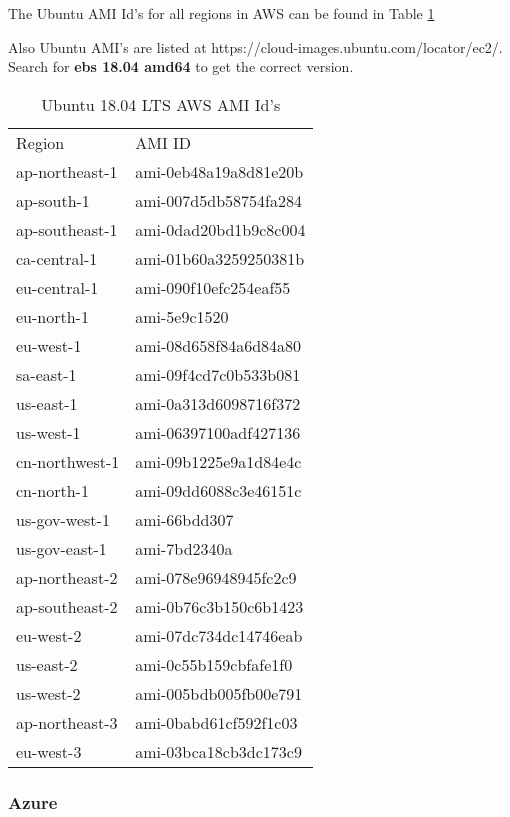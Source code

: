 The Ubuntu AMI Id's for all regions in AWS can be found in Table \ref{ubuntuami}

Also Ubuntu AMI's are listed at https://cloud-images.ubuntu.com/locator/ec2/. Search for \textbf{ebs 18.04 amd64} to get the correct version.

\begin{table}[]
\centering
\begin{tabular}{ll}
Region         & AMI ID                \\
ap-northeast-1 & ami-0eb48a19a8d81e20b \\
ap-south-1     & ami-007d5db58754fa284 \\
ap-southeast-1 & ami-0dad20bd1b9c8c004 \\
ca-central-1   & ami-01b60a3259250381b \\
eu-central-1   & ami-090f10efc254eaf55 \\
eu-north-1     & ami-5e9c1520          \\
eu-west-1      & ami-08d658f84a6d84a80 \\
sa-east-1      & ami-09f4cd7c0b533b081 \\
us-east-1      & ami-0a313d6098716f372 \\
us-west-1      & ami-06397100adf427136 \\
cn-northwest-1 & ami-09b1225e9a1d84e4c \\
cn-north-1     & ami-09dd6088c3e46151c \\
us-gov-west-1  & ami-66bdd307          \\
us-gov-east-1  & ami-7bd2340a          \\
ap-northeast-2 & ami-078e96948945fc2c9 \\
ap-southeast-2 & ami-0b76c3b150c6b1423 \\
eu-west-2      & ami-07dc734dc14746eab \\
us-east-2      & ami-0c55b159cbfafe1f0 \\
us-west-2      & ami-005bdb005fb00e791 \\
ap-northeast-3 & ami-0babd61cf592f1c03 \\
eu-west-3      & ami-03bca18cb3dc173c9
\end{tabular}
\caption{Ubuntu 18.04 LTS AWS AMI Id's}
\label{ubuntuami}
\end{table}

\subsubsection{Azure}

